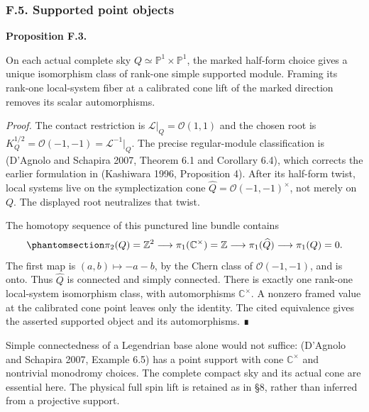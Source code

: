 \documentclass[
  english,
  11pt,
  reqno]{amsart}
\makeatletter
\newcommand{\pandocstatementheading}[1]{%
  \par\addpenalty{\@beginparpenalty}%
  \addvspace{.5\baselineskip plus .2\baselineskip minus .2\baselineskip}%
  {\normalfont\bfseries #1\par}%
  \nobreak\@afterindenttrue\@afterheading
}
\makeatother
\begin{document}
\protect{}\label{sec:gg-op-static-points}

\subsubsection{F.5. Supported point
objects}\label{f.5.-supported-point-objects}

\pandocstatementheading{\protect{}\label{prop:gg-op-static-points}Proposition F.3.}

On each actual complete sky \(Q\simeq\mathbb P^1\times\mathbb P^1\), the
marked half-form choice gives a unique isomorphism class of rank-one
simple supported module. Framing its rank-one local-system fiber at a
calibrated cone lift of the marked direction removes its scalar
automorphisms.

\emph{Proof.} The contact restriction is
\(\mathcal L|_Q=\mathcal O(1,1)\) and the chosen root is
\(K_Q^{1/2}=\mathcal O(-1,-1)=\mathcal L^{-1}|_Q\). The precise
regular-module classification is (D'Agnolo and Schapira 2007, Theorem
6.1 and Corollary 6.4), which corrects the earlier formulation in
(Kashiwara 1996, Proposition 4). After its half-form twist, local
systems live on the symplectization cone
\(\widehat Q=\mathcal O(-1,-1)^\times\), not merely on \(Q\). The
displayed root neutralizes that twist.

The homotopy sequence of this punctured line bundle contains
\begin{equation}\protect\phantomsection\label{eq:gg-op-sky-cone-homotopy}{
 \pi_2(Q)=\mathbb Z^2
   \longrightarrow\pi_1(\mathbb C^\times)=\mathbb Z
   \longrightarrow\pi_1(\widehat Q)
   \longrightarrow\pi_1(Q)=0.
}\end{equation} The first map is \((a,b)\mapsto-a-b\), by the Chern
class of \(\mathcal O(-1,-1)\), and is onto. Thus \(\widehat Q\) is
connected and simply connected. There is exactly one rank-one
local-system isomorphism class, with automorphisms \(\mathbb C^\times\).
A nonzero framed value at the calibrated cone point leaves only the
identity. The cited equivalence gives the asserted supported object and
its automorphisms. ∎

Simple connectedness of a Legendrian base alone would not suffice:
(D'Agnolo and Schapira 2007, Example 6.5) has a point support with cone
\(\mathbb C^\times\) and nontrivial monodromy choices. The complete
compact sky and its actual cone are essential here. The physical full
spin lift is retained as in §8, rather than inferred from a projective
support.
\end{document}
